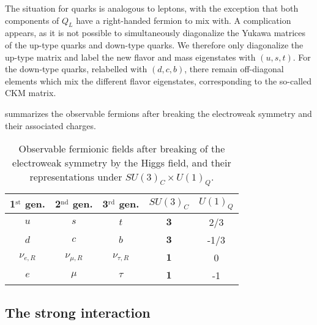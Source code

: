     The situation for quarks is analogous to leptons, with the exception that both components
    of $Q_L$ have a right-handed fermion to mix with. A complication appears, as
    it is not possible to simultaneously diagonalize the Yukawa matrices of the up-type
    quarks and down-type quarks. We therefore only diagonalize the up-type matrix and
    label the new flavor and mass eigenstates with $(u,s,t)$. For the down-type quarks,
    relabelled with $(d,c,b)$, there remain off-diagonal elements which mix the
    different flavor eigenstates, corresponding to the so-called CKM matrix.

     summarizes the observable
    fermions after breaking the electroweak symmetry and their associated charges.

    \begin{table}[b]
        \centering
        \begin{tabular}{|ccc||cc|}
            \hline
            1$^\text{st}$ gen. & 2$^\text{nd}$ gen. & 3$^\text{rd}$ gen.  & $SU(3)_C$ & $U(1)_Q$  \\
            \hline
            \hline
            $u$                & $s$                & $t$                 & $\mathbf{3}$ &  2/3 \\
            $d$                & $c$                & $b$                 & $\mathbf{3}$ & -1/3 \\
            \hline
            \hline
            $\nu_{e,R}$        & $\nu_{\mu,R}$      & $\nu_{\tau,R}$      & $\mathbf{1}$ &  0   \\
            $e$                & $\mu$              & $\tau$              & $\mathbf{1}$ & -1   \\
            \hline
        \end{tabular}
        \caption{Observable fermionic fields after breaking of the electroweak symmetry
        by the Higgs field, and their representations under $SU(3)_C \times U(1)_Q$.}
        \label{tab:StandardModelFieldsAfterElectroweakBreaking}
    \end{table}

    \subsection{The strong interaction \label{sec:strongInteraction}}

